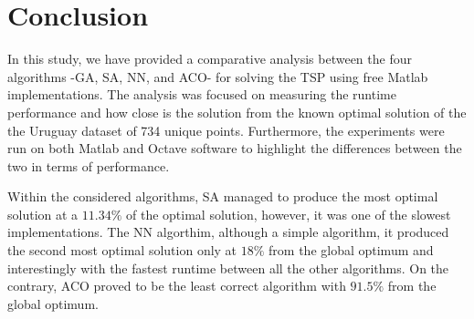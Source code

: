 \documentclass[twocolumn]{article}
\begin{document}
	\begin{table}[h!]
		\caption{Results of TSP algorithms}
	\label{tab:results}
	\end{table}

	
	\section{Conclusion}
	In this study, we have provided a comparative analysis between the four algorithms -GA, SA, NN, and ACO- for solving the TSP using free {Matlab\texttrademark} implementations. The analysis was focused on measuring the runtime performance and how close is the solution from the known optimal solution of the the Uruguay dataset of 734 unique points. Furthermore, the experiments were run on both {Matlab\texttrademark} and Octave software to highlight the differences between the two in terms of performance.
	
	Within the considered algorithms, SA managed to produce the most optimal solution at a $11.34\%$ of the optimal solution, however, it was one of the slowest implementations. The NN algorthim, although a simple algorithm, it produced the second most optimal solution only at $18\%$ from the global optimum and interestingly with the fastest runtime between all the other algorithms. On the contrary, ACO proved to be the least correct algorithm with $91.5\%$ from the global optimum.
	
\end{document}
